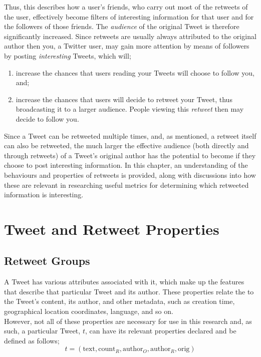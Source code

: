 Thus, this describes how a user's friends, who carry out most of the retweets of the user, effectively become filters of interesting information for that user and for the followers of those friends. The \textit{audience} of the original Tweet is therefore significantly increased. Since retweets are usually always attributed to the original author then you, a Twitter user, may gain more attention by means of followers by posting \textit{interesting} Tweets, which will; 
\begin{enumerate}
\item increase the chances that users reading your Tweets will choose to follow you, and;
\item increase the chances that users will decide to retweet your Tweet, thus broadcasting it to a larger audience. People viewing this \textit{retweet} then may decide to follow you. 
\end{enumerate}

Since a Tweet can be retweeted multiple times, and, as mentioned, a retweet itself can also be retweeted, the much larger the effective audience (both directly and through retweets) of a Tweet's original author has the potential to become if they choose to post interesting information. In this chapter, an understanding of the behaviours and properties of retweets is provided, along with discussions into how these are relevant in researching useful metrics for determining which retweeted information is interesting.


\section{Tweet and Retweet Properties}

\subsection{Retweet Groups}
A Tweet has various attributes associated with it, which make up the features that describe that particular Tweet and its author. These properties relate the to the Tweet's content, its author, and other metadata, such as creation time, geographical location coordinates, language, and so on.\\
However, not all of these properties are necessary for use in this research and, as such, a particular Tweet, $t$, can have its relevant properties declared and be defined as follows;
\[
	t = (\mathrm{text}, \mathrm{count}_R, \mathrm{author}_O, \mathrm{author}_R, \mathrm{orig})
\]

